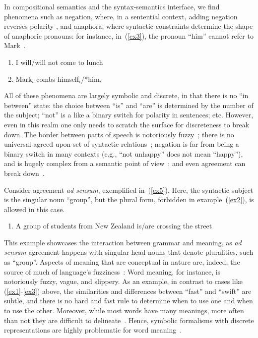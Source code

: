 In compositional semantics and the syntax-semantics interface, we find phenomena such as negation, where, in a sentential context, adding negation reverses polarity  \cite[][see example~(\ref{ex6})]{zeijlstra2007negation}, and anaphora, where syntactic constraints determine the shape of anaphoric pronouns: for instance, in~(\ref{ex3}), the pronoun ``him'' cannot refer to Mark~\cite{Chomsky1981}.

\renewcommand{\labelenumi}{(\theenumi)}
\begin{enumerate}[resume]
\item \label{ex6} I will/will not come to lunch
\item \label{ex3} Mark$_i$ combs himself$_i$/*him$_i$
\end{enumerate}

All of these phenomena are largely symbolic and discrete, in that there is no ``in between'' state: the choice between ``is'' and ``are'' is determined by the number of the subject; ``not'' is a like a binary switch for polarity in sentences; etc.
However, even in this realm one only needs to scratch the surface for discreteness to break down.
The border between parts of speech is notoriously fuzzy~\cite{Croft2001,Evans2009}; there is no universal agreed upon set of syntactic relations~\cite{dowty1991thematic}; negation is far from being a binary switch in many contexts (e.g., ``not unhappy'' does not mean ``happy''), and is hugely complex from a semantic point of view~\cite{zeijlstra2007negation};
and even agreement can break down~\cite{wechsler2003many}.

Consider agreement \textit{ad sensum}, exemplified in~(\ref{ex5}).
Here, the syntactic subject is the singular noun ``group'', but the plural form, forbidden in example~(\ref{ex2}), is allowed in this case.

\begin{enumerate}[resume]
\item \label{ex5} A group of students from New Zealand is/are crossing the street
\end{enumerate}

This example showcases the interaction between grammar and meaning, as \textit{ad sensum} agreement happens with singular head nouns that denote pluralities, such as ``group''.
Aspects of meaning that are conceptual in nature are, indeed, the source of much of language's fuzziness~\cite{wittgenstein53}:
Word meaning, for instance, is notoriously fuzzy, vague, and slippery.
As an example, in contrast to cases like (\ref{ex1}-\ref{ex3}) above, the similarities and differences between ``fast'' and ``swift'' are subtle, and there is no hard and fast rule to determine when to use one and when to use the other.
Moreover, while most words have many meanings, more often than not they are difficult to delineate~\cite{kilgarriff97}.
Hence, symbolic formalisms with discrete representations are highly problematic for word meaning~\cite{wittgenstein53,kilgarriff97,boleda2020distributional}.

